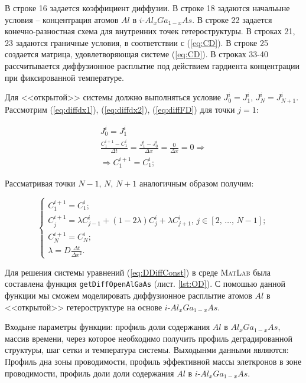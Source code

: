В строке 16 задается коэффициент диффузии. В строке 18 задаются начальыне условия -- концентрация атомов $Al$ в $i$-$Al_{x}Ga_{1-x}As$. В строке 22 задается конечно-разностная схема для внутренних точек гетероструктуры. В строках 21, 23 задаются граничные условия, в соответствии с (\ref{eq:CD}). В строке 25 создается матрица, удовлетворяющая системе (\ref{eq:CD}). В строках 33-40 рассчитывается диффузионное расплытие под действием гардиента концентрации при фиксированной температуре.

Для <<открытой>> системы должно выполняться условие $J_{0}^{i} = J_{1}^{i}$, $J_{N}^{i} = J_{N+1}^{i}$. Рассмотрим (\ref{eq:diffdx1}), (\ref{eq:diffdx2}), (\ref{eq:diffFD}) для точки $j = 1$:

\begin{gather*}
 	J^{i}_{0} = J^{i}_{1}\\
	\frac{C^{i+1}_{1} - C^{i}_{1}}{\Delta t} = \frac{J^{i}_{1} - J^{i}_{0}}{\Delta x} = \frac{0}{\Delta x} = 0\Rightarrow\\
	\Rightarrow C^{i+1}_{1} = C^{i}_{1};
\end{gather*}

Рассматривая точки $N-1$, $N$, $N+1$ аналогичным образом получим:

\begin{equation}
	\label{eq:DDiffConst}
	\begin{cases}
		C^{i+1}_{1} = C^{i}_{1};\\
		C^{i+1}_{j} = \lambda C^{i}_{j-1} + (1 - 2\lambda)C^{i}_{j} + \lambda C^{i}_{j+1},\,j \in [2,\,\dots,\,N-1];\\
		C^{i+1}_{N} = C^{i}_{N};\\
		\lambda = D\frac{\Delta t}{\Delta x^{2}}.
	\end{cases}
\end{equation}

Для решения системы уравнений (\ref{eq:DDiffConst}) в среде \textsc{MatLab} была составлена функция \texttt{getDiffOpenAlGaAs} (лист. \ref{lst:OD}). С помошью данной функции мы сможем моделировать диффузионное расплытие атомов $Al$ в <<открытой>> гетероструктуре на основе $i$-$Al_{x}Ga_{1-x}As$.

Входыне параметры функции: профиль доли содержания $Al$ в $Al_{x}Ga_{1-x}As$, массив времени, через которое необходимо получить профиль деградированной структуры, шаг сетки и температура системы. Выходынми данными являются: Профиль дна зоны проводимости, профиль эффективной массы элеткронов в зоне проводимости, профиль доли доли содержания $Al$ в $i$-$Al_{x}Ga_{1-x}As$.


